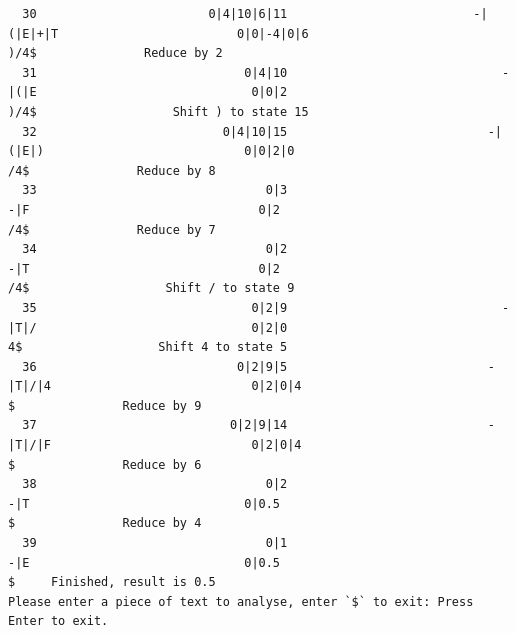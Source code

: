 \documentclass[UTF8]{ctexart}
\begin{document}
\begin{lstlisting}
  30                        0|4|10|6|11                          -|(|E|+|T                         0|0|-4|0|6                               )/4$               Reduce by 2
  31                             0|4|10                              -|(|E                              0|0|2                               )/4$                   Shift ) to state 15
  32                          0|4|10|15                            -|(|E|)                            0|0|2|0                                /4$               Reduce by 8
  33                                0|3                                -|F                                0|2                                /4$               Reduce by 7
  34                                0|2                                -|T                                0|2                                /4$                   Shift / to state 9
  35                              0|2|9                              -|T|/                              0|2|0                                 4$                   Shift 4 to state 5
  36                            0|2|9|5                            -|T|/|4                            0|2|0|4                                  $               Reduce by 9
  37                           0|2|9|14                            -|T|/|F                            0|2|0|4                                  $               Reduce by 6
  38                                0|2                                -|T                              0|0.5                                  $               Reduce by 4
  39                                0|1                                -|E                              0|0.5                                  $     Finished, result is 0.5
Please enter a piece of text to analyse, enter `$` to exit: Press Enter to exit.
    \end{lstlisting}
\end{document}
